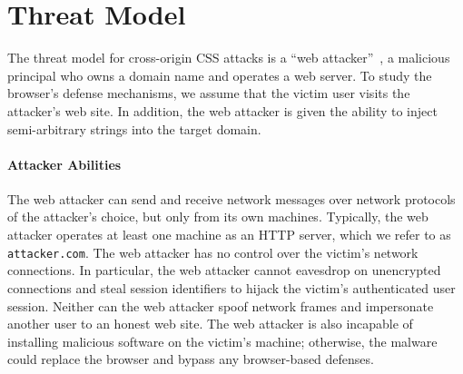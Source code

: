 \documentclass{acm_proc_article-sp}
\begin{document}
% 

% 

\section{Threat Model} \label{sec:threatmodel}

The threat model for cross-origin CSS attacks is a ``web
attacker''~\cite{jackson09thesis}, a malicious principal who owns a domain
name and operates a web server. To study the browser's defense mechanisms, we
assume that the victim user visits the attacker's web site. In addition, the
web attacker is given the ability to inject semi-arbitrary strings into the
target domain.
% 

\paragraph{Attacker Abilities}
The web attacker can send and receive network messages over network protocols of the attacker's choice, but only from its own machines. Typically, the web attacker operates at least one machine as an HTTP server, which we refer to as \texttt{attacker.com}. The web attacker has no control over the victim's network connections. In particular, the web attacker cannot eavesdrop on unencrypted connections and steal session identifiers to hijack the victim's authenticated user session. Neither can the web attacker spoof network frames and impersonate another user to an honest web site.
The web attacker is also incapable of installing malicious software on the victim's machine; otherwise, the malware could replace the browser and bypass any browser-based defenses.
\end{document}
